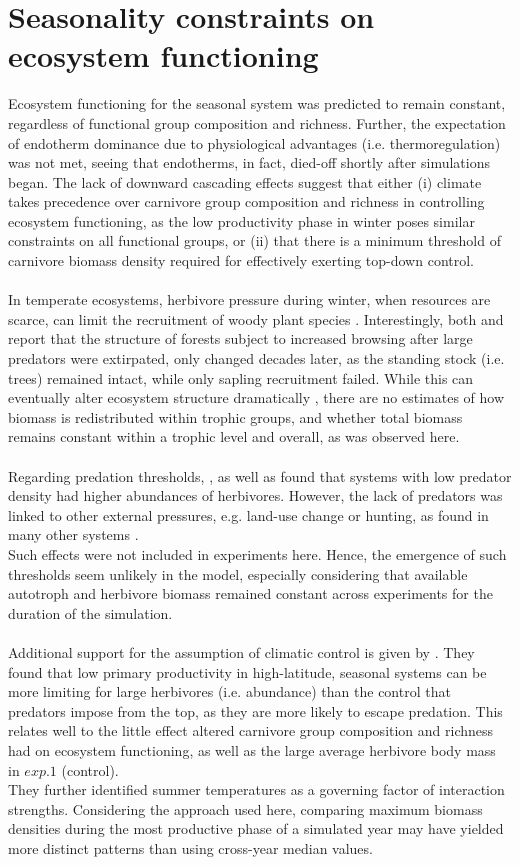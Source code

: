 \section{Seasonality constraints on ecosystem functioning}
Ecosystem functioning for the seasonal system was predicted to remain constant, regardless of functional group composition and richness. Further, the expectation of endotherm dominance due to physiological advantages (i.e. thermoregulation) was not met, seeing that endotherms, in fact, died-off shortly after simulations began. The lack of downward cascading effects suggest that either (i) climate takes precedence over carnivore group composition and richness in controlling ecosystem functioning, as the low productivity phase in winter poses similar constraints on all functional groups, or (ii) that there is a minimum threshold of carnivore biomass density required for effectively exerting top-down control.\\\\
In temperate ecosystems, herbivore pressure during winter, when resources are scarce, can limit the recruitment of woody plant species \citep{Ripple2014}.
Interestingly, both \cite{Casabon2007} and \citep{Beschta2009} report that the structure of forests subject to increased browsing after large predators were extirpated, only changed decades later, as the standing stock (i.e. trees) remained intact, while only sapling recruitment failed.
While this can eventually alter ecosystem structure dramatically \citep{Terborgh2001, Estes2011}, there are no estimates of how biomass is redistributed within trophic groups, and whether total biomass remains constant within a trophic level and overall, as was observed here. \\\\
Regarding predation thresholds, \cite{Ripple2012}, as well as \cite{Johnson2009} found that systems with low predator density had higher abundances of herbivores. However, the lack of predators was linked to other external pressures, e.g. land-use change or hunting, as found in many other systems \citep{Estes2011,Ripple2014}. \\
Such effects were not included in experiments here. Hence, the emergence of such thresholds seem unlikely in the model, especially considering that available autotroph and herbivore biomass remained constant across experiments for the duration of the simulation. \\\\
Additional support for the assumption of climatic control is given by  \cite{Legagneux2014}. They found that low primary productivity in high-latitude, seasonal systems can be more limiting for large herbivores (i.e. abundance) than the control that predators impose from the top, as they are more likely to escape predation. 
This relates well to the little effect altered carnivore group composition and richness had on ecosystem functioning, as well as the large average herbivore body mass in $exp. 1$ (control). \\
They further identified summer temperatures as a governing factor of interaction strengths. Considering the approach used here, comparing maximum biomass densities during the most productive phase of a simulated year may have yielded more distinct patterns than using cross-year median values.
